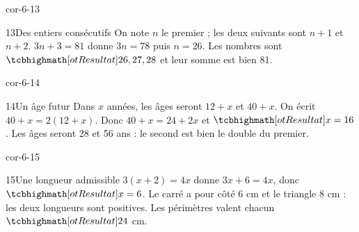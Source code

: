 \begin{blocLivre}{cor-6-13}\begin{corrige}{13}{Des entiers consécutifs}
On note $n$ le premier ; les deux suivants sont $n+1$ et $n+2$. $3n+3=81$ donne $3n=78$ puis $n=26$. Les nombres sont $\res{26,27,28}$ et leur somme est bien 81.
\end{corrige}\end{blocLivre}
\begin{blocLivre}{cor-6-14}\begin{corrige}{14}{Un âge futur}
Dans $x$ années, les âges seront $12+x$ et $40+x$. On écrit $40+x=2(12+x)$. Donc $40+x=24+2x$ et $\res{x=16}$. Les âges seront 28 et 56 ans : le second est bien le double du premier.
\end{corrige}\end{blocLivre}
\begin{blocLivre}{cor-6-15}\begin{corrige}{15}{Une longueur admissible}
$3(x+2)=4x$ donne $3x+6=4x$, donc $\res{x=6}$. Le carré a pour côté 6 cm et le triangle 8 cm : les deux longueurs sont positives. Les périmètres valent chacun $\res{24}$ cm.
\label{fig-cor-6-15}
\end{corrige}\end{blocLivre}
